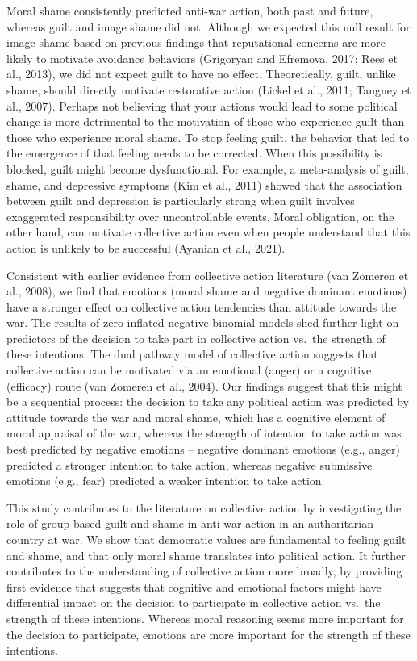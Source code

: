 \documentclass[
]{article}
\begin{document}
Moral shame consistently predicted anti-war action, both past and future, whereas guilt and image shame did not. Although we expected this null result for image shame based on previous findings that reputational concerns are more likely to motivate avoidance behaviors (Grigoryan and Efremova, 2017; Rees et al., 2013), we did not expect guilt to have no effect. Theoretically, guilt, unlike shame, should directly motivate restorative action (Lickel et al., 2011; Tangney et al., 2007). Perhaps not believing that your actions would lead to some political change is more detrimental to the motivation of those who experience guilt than those who experience moral shame. To stop feeling guilt, the behavior that led to the emergence of that feeling needs to be corrected. When this possibility is blocked, guilt might become dysfunctional. For example, a meta-analysis of guilt, shame, and depressive symptoms (Kim et al., 2011) showed that the association between guilt and depression is particularly strong when guilt involves exaggerated responsibility over uncontrollable events. Moral obligation, on the other hand, can motivate collective action even when people understand that this action is unlikely to be successful (Ayanian et al., 2021).

Consistent with earlier evidence from collective action literature (van Zomeren et al., 2008), we find that emotions (moral shame and negative dominant emotions) have a stronger effect on collective action tendencies than attitude towards the war. The results of zero-inflated negative binomial models shed further light on predictors of the decision to take part in collective action vs.~the strength of these intentions. The dual pathway model of collective action suggests that collective action can be motivated via an emotional (anger) or a cognitive (efficacy) route (van Zomeren et al., 2004). Our findings suggest that this might be a sequential process: the decision to take any political action was predicted by attitude towards the war and moral shame, which has a cognitive element of moral appraisal of the war, whereas the strength of intention to take action was best predicted by negative emotions -- negative dominant emotions (e.g., anger) predicted a stronger intention to take action, whereas negative submissive emotions (e.g., fear) predicted a weaker intention to take action.

This study contributes to the literature on collective action by investigating the role of group-based guilt and shame in anti-war action in an authoritarian country at war. We show that democratic values are fundamental to feeling guilt and shame, and that only moral shame translates into political action. It further contributes to the understanding of collective action more broadly, by providing first evidence that suggests that cognitive and emotional factors might have differential impact on the decision to participate in collective action vs.~the strength of these intentions. Whereas moral reasoning seems more important for the decision to participate, emotions are more important for the strength of these intentions.
\end{document}
